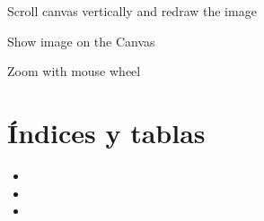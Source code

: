 \documentclass[letterpaper,10pt,spanish]{sphinxmanual}
\begin{document}
\begin{fulllineitems}
\begin{fulllineitems}
\end{fulllineitems}


\begin{fulllineitems}
\label{\detokenize{probeDesignerUI:probeDesignerUI.Zoom_Advanced.scroll_y}}
\pysigstartsignatures
{}
\pysigstopsignatures
\sphinxAtStartPar
Scroll canvas vertically and redraw the image

\end{fulllineitems}


\begin{fulllineitems}
\label{\detokenize{probeDesignerUI:probeDesignerUI.Zoom_Advanced.show_image}}
\pysigstartsignatures
{}
\pysigstopsignatures
\sphinxAtStartPar
Show image on the Canvas

\end{fulllineitems}


\begin{fulllineitems}
\label{\detokenize{probeDesignerUI:probeDesignerUI.Zoom_Advanced.wheel}}
\pysigstartsignatures
{}
\pysigstopsignatures
\sphinxAtStartPar
Zoom with mouse wheel

\end{fulllineitems}


\end{fulllineitems}



\chapter{Índices y tablas}
\label{\detokenize{index:indices-y-tablas}}\begin{itemize}
\item {} 
\sphinxAtStartPar
{}

\item {} 
\sphinxAtStartPar
{}

\item {} 
\sphinxAtStartPar
{}

\end{itemize}
\end{document}

